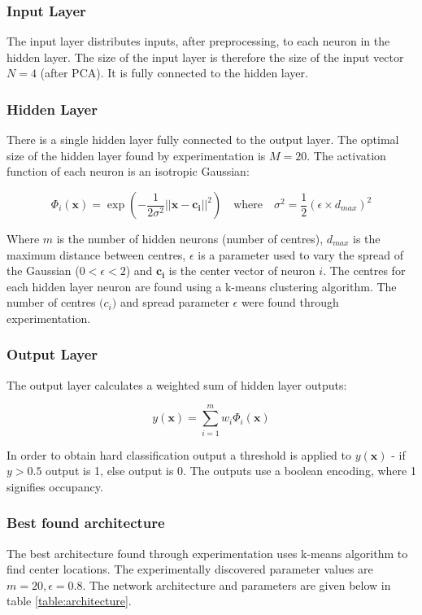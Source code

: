 \documentclass[a4paper, 11pt]{article}
\begin{document}
\subsubsection{Input Layer}
The input layer distributes inputs, after preprocessing, to each neuron in the hidden layer. The size of the input layer is therefore the size of the input vector $N=4$ (after PCA). It is fully connected to the hidden layer.

\subsubsection{Hidden Layer}
There is a single hidden layer fully connected to the output layer. The optimal size of the hidden layer found by experimentation is $M=20$. The activation function of each neuron is an isotropic Gaussian:

\begin{equation}
\Phi_i(\boldsymbol{x}) = \exp\left(-\frac{1}{2\sigma^2} \lvert\lvert \boldsymbol{x} -  \boldsymbol{c_i} \rvert\rvert ^2\right)
\quad \mathrm{where }\quad
\sigma^2 = \frac{1}{2}(\epsilon \times d_{max})^2
\label{eq:rbf}
\end{equation}


Where $m$ is the number of hidden neurons (number of centres), $d_{max}$ is the maximum distance between centres, $\epsilon$ is a parameter used to vary the spread of the Gaussian ($0<\epsilon<2$) and $\boldsymbol{c_i}$ is the center vector of neuron $i$. The centres for each hidden layer neuron are found using a k-means clustering algorithm. The number of centres $\boldsymbol(c_i)$ and spread parameter $\epsilon$ were found through experimentation.

\subsubsection{Output Layer}
The output layer calculates a weighted sum of hidden layer outputs:

\begin{equation}
y(\boldsymbol{x}) = \displaystyle\sum_{i=1}^{m} w_i \Phi_i(\boldsymbol{x})
\end{equation}


In order to obtain hard classification output a threshold is applied to $y(\boldsymbol{x})$ - if $y>0.5$ output is 1, else output is 0. The outputs use a boolean encoding, where 1 signifies occupancy.

\subsubsection{Best found architecture}
The best architecture found through experimentation uses k-means algorithm to find center locations. The experimentally discovered parameter values are $m = 20, \epsilon = 0.8$. The network architecture and parameters are given below in table \ref{table:architecture}.
\end{document}
